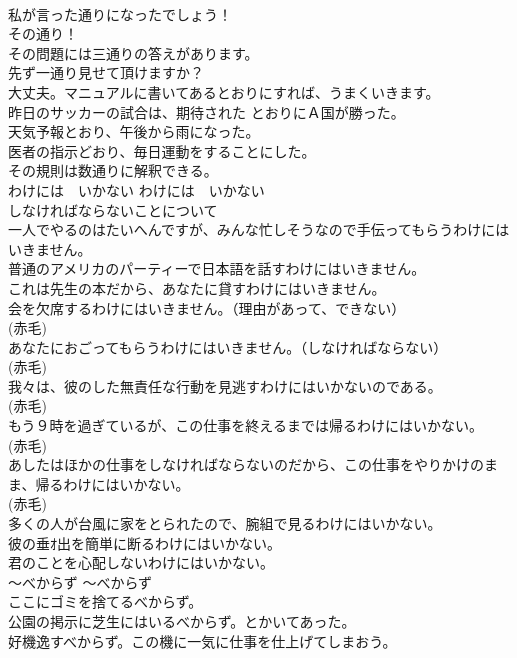 \documentclass[8pt]{extreport}
\begin{document}
\begin{CJK}{UTF8}{min}
\\	私が言った通りになったでしょう！  
\\	その通り！  
\\	その問題には三通りの答えがあります。  
\\	先ず一通り見せて頂けますか？  
\\	大丈夫。マニュアルに書いてあるとおりにすれば、うまくいきます。   
\\	昨日のサッカーの試合は、期待された とおりにＡ国が勝った。  
\\	天気予報とおり、午後から雨になった。  
\\	医者の指示どおり、毎日運動をすることにした。  
\\	その規則は数通りに解釈できる。   
\\	わけには　いかない	わけには　いかない	
\\	しなければならないことについて	
\\	一人でやるのはたいへんですが、みんな忙しそうなので手伝ってもらうわけにはいきません。  
\\	普通のアメリカのパーティーで日本語を話すわけにはいきません。   
\\	これは先生の本だから、あなたに貸すわけにはいきません。  
\\	会を欠席するわけにはいきません。（理由があって、できない）  
\\	(赤毛)
\\	あなたにおごってもらうわけにはいきません。（しなければならない）  
\\	(赤毛)
\\	我々は、彼のした無責任な行動を見逃すわけにはいかないのである。  
\\	(赤毛)
\\	もう９時を過ぎているが、この仕事を終えるまでは帰るわけにはいかない。  
\\	(赤毛)
\\	あしたはほかの仕事をしなければならないのだから、この仕事をやりかけのまま、帰るわけにはいかない。  
\\	(赤毛)
\\	多くの人が台風に家をとられたので、腕組で見るわけにはいかない。  
\\	彼の垂ｵ出を簡単に断るわけにはいかない。   
\\	君のことを心配しないわけにはいかない。  
\\	〜べからず	〜べからず	
\\	ここにゴミを捨てるべからず。  
\\	公園の掲示に芝生にはいるべからず。とかいてあった。   
\\	好機逸すべからず。この機に一気に仕事を仕上げてしまおう。   

\end{CJK}
\end{document}
